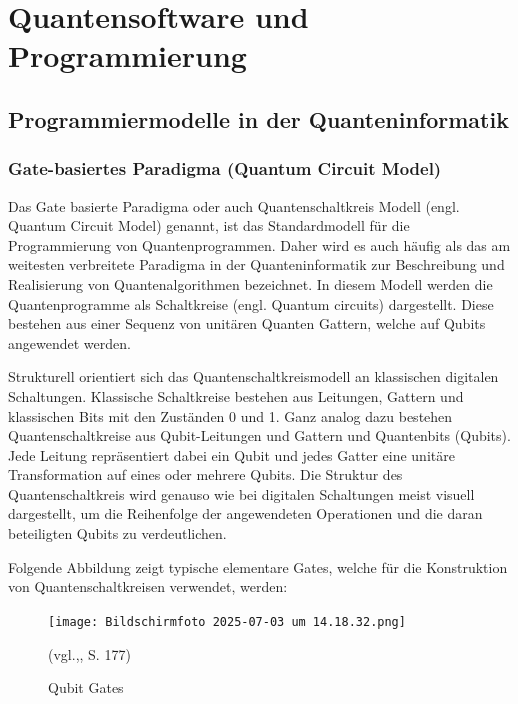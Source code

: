 \chapter{Quantensoftware und Programmierung}
\label{programming} %



\section{Programmiermodelle in der Quanteninformatik}

\subsection{Gate-basiertes Paradigma (Quantum Circuit Model)}
Das Gate basierte Paradigma oder auch Quantenschaltkreis Modell (engl. Quantum Circuit Model) genannt, ist das Standardmodell für die Programmierung von Quantenprogrammen. Daher wird es auch häufig als das am weitesten verbreitete Paradigma in der Quanteninformatik zur Beschreibung und Realisierung von Quantenalgorithmen bezeichnet. In diesem Modell werden die Quantenprogramme als Schaltkreise (engl. Quantum circuits) dargestellt. Diese bestehen aus einer Sequenz von unitären Quanten Gattern, welche auf Qubits angewendet werden. 

Strukturell orientiert sich das Quantenschaltkreismodell an klassischen digitalen Schaltungen. Klassische Schaltkreise bestehen aus Leitungen, Gattern und klassischen Bits mit den Zuständen 0 und 1. Ganz analog dazu bestehen Quantenschaltkreise aus Qubit-Leitungen und Gattern und Quantenbits (Qubits). Jede Leitung repräsentiert dabei ein Qubit und jedes Gatter eine unitäre Transformation auf eines oder mehrere Qubits. Die Struktur des Quantenschaltkreis wird genauso wie bei digitalen Schaltungen meist visuell dargestellt, um die Reihenfolge der angewendeten Operationen und die daran beteiligten Qubits zu verdeutlichen. 

Folgende Abbildung zeigt typische elementare Gates, welche für die Konstruktion von Quantenschaltkreisen verwendet, werden: 
\begin{figure}
    \centering
    \texttt{[image: Bildschirmfoto 2025-07-03 um 14.18.32.png]}
    \caption{Qubit Gates} (vgl.\citeauthor{nielsen_quantum_2010},\citeyear{nielsen_quantum_2010}, S. 177)
    \label{fig:enter-label}
\end{figure}

